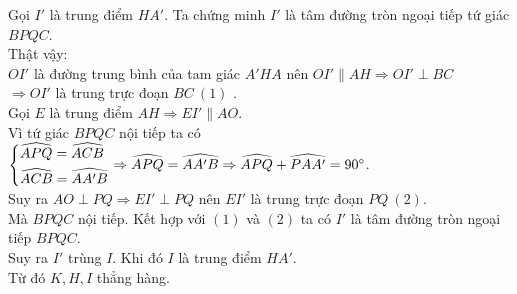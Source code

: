 \begin{vd}
{\begin{enumerate}
         Gọi $I'$ là trung điểm $HA'$. Ta chứng minh $I'$ là tâm đường tròn ngoại tiếp tứ giác $BPQC$.\\
         Thật vậy:\\
         $OI'$ là đường trung bình của tam giác $A'HA$ nên $OI'\parallel AH\Rightarrow OI'\perp BC$\\ $\Rightarrow OI'$ là trung trực đoạn $BC\ (1)$ .\\
         Gọi $E$ là trung điểm $AH\Rightarrow EI'\parallel AO$.\\
         Vì tứ giác $BPQC$ nội tiếp ta có $\left\{\begin{aligned}&\widehat{APQ}=\widehat{ACB}\\&\widehat{ACB}=\widehat{AA'B}\end{aligned}\right.\Rightarrow \widehat{APQ}=\widehat{AA'B}\Rightarrow \widehat{APQ}+\widehat{PAA'}=90^\circ$.\\
         Suy ra $AO\perp PQ\Rightarrow EI'\perp PQ$ nên $EI'$ là trung trực đoạn $PQ\ (2)$.\\
         Mà $BPQC$ nội tiếp. Kết hợp với $(1)$ và $(2)$ ta có $I'$ là tâm đường tròn ngoại tiếp $BPQC$.\\
         Suy ra $I'$ trùng $I$. Khi đó $I$ là trung điểm $HA'$.\\
         Từ đó $K,H,I$ thẳng hàng.
    \end{enumerate}
}
\end{vd}



